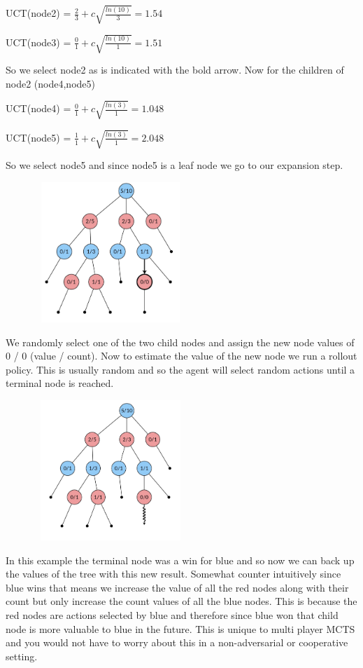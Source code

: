 \begin{search_page}
UCT(node2) = $ \frac{2}{3} + c \sqrt{\frac{ln({10})}{3}} = 1.54$

UCT(node3) = $ \frac{0}{1} + c \sqrt{\frac{ln({10})}{1}} = 1.51$

So we select node2 as is indicated with the bold arrow. Now for the children of node2 (node4,node5)

UCT(node4) = $ \frac{0}{1} + c \sqrt{\frac{ln({3})}{1}} = 1.048$

UCT(node5) = $ \frac{1}{1} + c \sqrt{\frac{ln({3})}{1}} = 2.048$

So we select node5 and since node5 is a leaf node we go to our expansion step.

\includegraphics[width=300px,height=200px]{images/mcts_expansion.png}

We randomly select one of the two child nodes and assign the new node values of 0 / 0 (value / count). Now to estimate the value of the new node we run a rollout policy. This is usually random and so the agent will select random actions until a terminal node is reached. 

\includegraphics[width=300px,height=200px]{images/mcts_simulation.png}

In this example the terminal node was a win for blue and so now we can back up the values of the tree with this new result. Somewhat counter intuitively since blue wins that means we increase the value of all the red nodes along with their count but only increase the count values of all the blue nodes. This is because the red nodes are actions selected by blue and therefore since blue won that child node is more valuable to blue in the future. This is unique to multi player MCTS and you would not have to worry about this in a non-adversarial or cooperative setting. 


\end{search_page}
